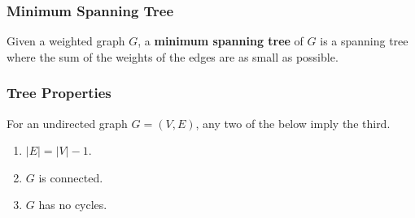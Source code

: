 \documentclass[letterpaper]{article}
\begin{document}
\subsubsection{Minimum Spanning Tree}
\begin{definition}{}{}
    Given a weighted graph $G$, a \textbf{minimum spanning tree} of $G$ is a spanning tree where the sum of the weights of the edges are as small as possible. 
\end{definition}

\subsubsection{Tree Properties}
\begin{lemma}{}{}
    For an undirected graph $G = (V, E)$, any two of the below imply the third. 
    \begin{enumerate}
        \item $|E| = |V| - 1$. 
        \item $G$ is connected. 
        \item $G$ has no cycles. 
    \end{enumerate}
\end{lemma}
\end{document}
